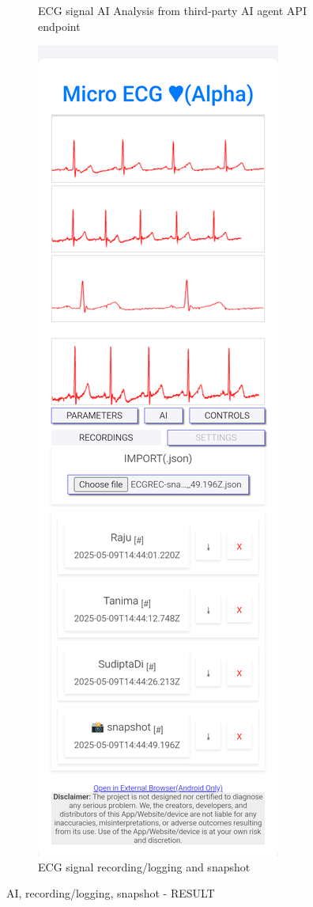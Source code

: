 \begin{figure}
\begin{subfigure}[b]{0.45\textwidth}
        \caption{ECG signal AI Analysis from third-party AI agent API endpoint}
    \end{subfigure}
    \hfill
    \begin{subfigure}[b]{0.45\textwidth}
        \includegraphics[width=\textwidth]{images/result-recordings.png}
        \caption{ECG signal recording/logging and snapshot}
    \end{subfigure}
    \caption{AI, recording/logging, snapshot - RESULT}
\end{figure}

